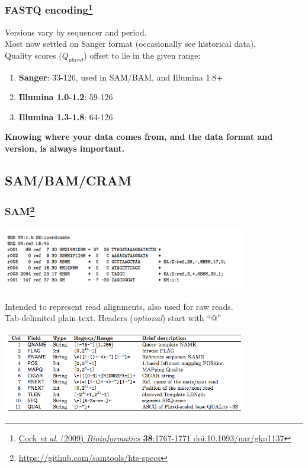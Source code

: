 \begin{frame}[fragile]
  \frametitle{FASTQ encoding\footnote{\tiny{\href{http://dx.doi.org/10.1093/nar/gkp1137}{Cock \textit{et al}. (2009) \textit{Bioinformatics} \textbf{38}:1767-1771 doi:10.1093/nar/gkp1137}}}}
  Versions vary by sequencer and period. \\
  Most now settled on Sanger format (occasionally see historical data). \\
  Quality scores ($Q_{phred}$) offset to lie in the given range:
  \begin{enumerate}
    \item \textbf{Sanger}: 33-126, used in SAM/BAM, and Illumina 1.8+
    \item \textbf{Illumina 1.0-1.2}: 59-126
    \item \textbf{Illumina 1.3-1.8}: 64-126
  \end{enumerate}
  \textbf{Knowing where your data comes from, and the data format and version, is always important.}
\end{frame}



\subsection{SAM/BAM/CRAM}

\begin{frame}[fragile]
  \frametitle{SAM\footnote{\tiny{\href{http://samtools.github.io/hts-specs/SAMv1.pdf}{https://github.com/samtools/hts-specs}}}}
  \begin{center}
    \includegraphics[width=0.8\textwidth]{images/sam_format}
  \end{center}  
  Intended to represent read alignments, also used for raw reads. \\
  Tab-delimited plain text. Headers (\textit{optional}) start with ``@'' \\
  \begin{center}
    \includegraphics[width=0.8\textwidth]{images/sam_columns}
  \end{center}  
\end{frame}

